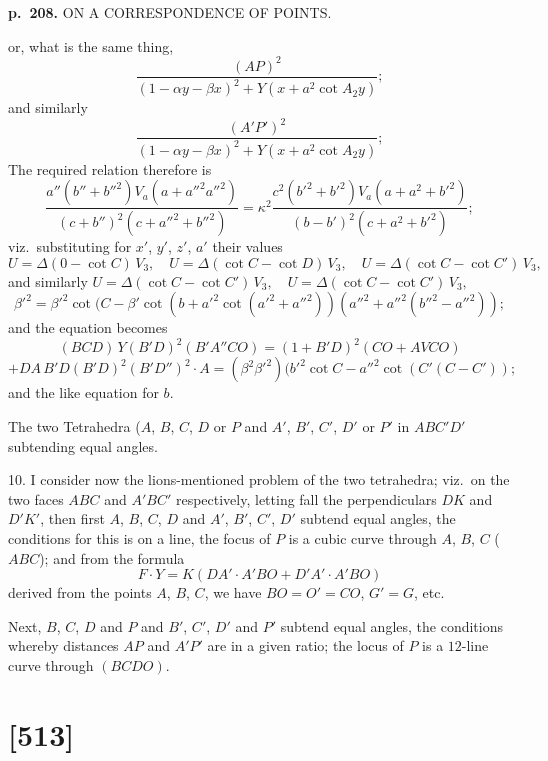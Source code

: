 \documentclass[11pt,a4paper]{book}
\begin{document}
\clearpage

\noindent
\textbf{p.~208.}  ON A CORRESPONDENCE OF POINTS.

or, what is the same thing,
\[
\frac{(AP)^2}{(1 - \alpha y - \beta x)^2 + Y(x + a^2 \cot A_2 y)};
\]
and similarly
\[
\frac{(A'P')^2}{(1 - \alpha y - \beta x)^2 + Y(x + a^2 \cot A_2 y)};
\]
The required relation therefore is
\[
\frac{a''(b'' + b''^2)V_a (a + a''^2 a''^2)}{(c + b'')^2 (c + a''^2 + b''^2)} = \kappa^2 \frac{c^2(b'^2 + b'^2)V_a (a + a^2 + b'^2)}{(b - b')^2 (c + a^2 + b'^2)};
\]
viz.\ substituting for $x'$, $y'$, $z'$, $a'$ their values
\[
U = \Delta(0 - \cot C)\,V_3, \quad U = \Delta(\cot C - \cot D)\,V_3, \quad U = \Delta(\cot C - \cot C')\,V_3,
\]
and similarly $U = \Delta(\cot C - \cot C')\,V_3, \quad U = \Delta(\cot C - \cot C')\,V_3,$
\[
\beta'^2 = \beta'^2 \cot(C - \beta' \cot(b + a'^2 \cot(a'^2 + a''^2 ))(a''^2 + a''^2(b''^2 - a''^2));
\]
and the equation becomes
\[
(BCD)\,Y(B'D)^2 (B'A''CO) = (1 + B'D)^2 (CO + AVCO)
\]
\[
+ DA\,B'D(B'D)^2 (B'D'')^2 \cdot A = (\beta^2 \beta'^2)(b'^2 \cot C - a''^2 \cot(C'(C - C'));
\]
and the like equation for $b$.

The two Tetrahedra ($A$, $B$, $C$, $D$ or $P$ and $A'$, $B'$, $C'$, $D'$ or $P'$ in $ABC'D'$ subtending equal angles.

10. I consider now the lions-mentioned problem of the two tetrahedra; viz.\ on the two faces $ABC$ and $A'BC'$ respectively, letting fall the perpendiculars $DK$ and $D'K'$, then first $A$, $B$, $C$, $D$ and $A'$, $B'$, $C'$, $D'$ subtend equal angles, the conditions for this is on a line, the focus of $P$ is a cubic curve through $A$, $B$, $C$ ($ABC$); and from the formula
\[
F \cdot Y = K (DA' \cdot A'BO + D'A' \cdot A'BO)
\]
derived from the points $A$, $B$, $C$, we have $BO = O' = CO$, $G' = G$, etc.

Next, $B$, $C$, $D$ and $P$ and $B'$, $C'$, $D'$ and $P'$ subtend equal angles, the conditions whereby distances $AP$ and $A'P'$ are in a given ratio; the locus of $P$ is a $12$-line curve through $(BCDO)$.


\clearpage

\section{[513]}
\end{document}
